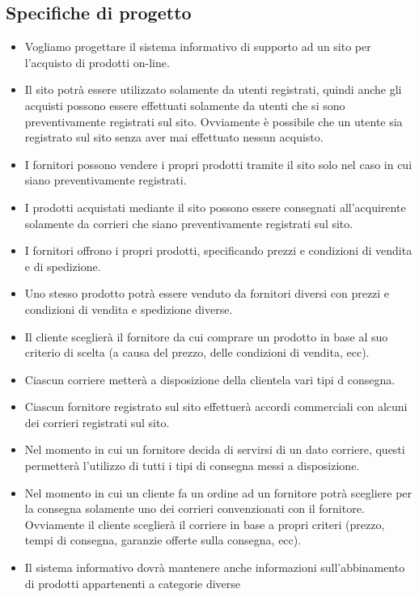 \subsection{Specifiche di progetto}
\begin{itemize}
	\item Vogliamo progettare il sistema informativo di supporto ad un sito per l’acquisto di prodotti on-line. 
	\item Il sito potrà essere utilizzato solamente da utenti registrati, quindi anche gli acquisti possono essere effettuati solamente da utenti che si sono preventivamente registrati sul sito. Ovviamente è possibile che un utente sia registrato sul sito senza aver mai effettuato nessun acquisto. 
	\item I fornitori possono vendere i propri prodotti tramite il sito solo nel caso in cui siano preventivamente registrati. 
	\item I prodotti acquistati mediante il sito possono essere consegnati all’acquirente solamente da corrieri che siano preventivamente registrati sul sito.
	\item I fornitori offrono i propri prodotti, specificando prezzi e condizioni di vendita e di spedizione. 
	\item Uno stesso prodotto potrà essere venduto da fornitori diversi con prezzi e condizioni di vendita e spedizione diverse. 
	\item Il cliente sceglierà il fornitore da cui comprare un prodotto in base al suo criterio di scelta (a causa del prezzo, delle condizioni di vendita, ecc).
	\item Ciascun corriere metterà a disposizione della clientela vari tipi d consegna. 
	\item Ciascun fornitore registrato sul sito effettuerà accordi commerciali con alcuni dei corrieri registrati sul sito. 
	\item Nel momento in cui un fornitore decida di servirsi di un dato corriere, questi permetterà l’utilizzo di tutti i tipi di consegna messi a disposizione. 
	\item Nel momento in cui un cliente fa un ordine ad un fornitore potrà scegliere per la consegna solamente uno dei corrieri convenzionati con il fornitore. Ovviamente il cliente sceglierà il corriere in base a propri criteri (prezzo, tempi di consegna, garanzie offerte sulla consegna, ecc).
	\item Il sistema informativo dovrà mantenere anche informazioni sull’abbinamento di prodotti appartenenti a categorie diverse

\end{itemize}

